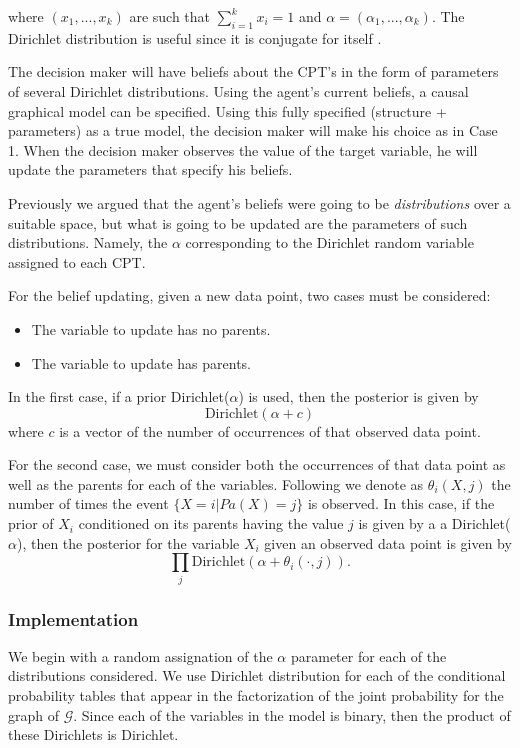 \documentclass[english,letterpaper,12pt,final]{article}
\theoremstyle{definition}
\begin{document}
where $(x_1,...,x_k)$ are such that $\sum_{i=1}^k x_i =1$ and $\alpha=(\alpha_1,...,\alpha_k)$. The Dirichlet distribution is useful since it is conjugate for itself \cite{bernardo2000bayesian}.

The decision maker will have beliefs about the CPT's in the form of parameters of several Dirichlet distributions. Using the agent's current beliefs, a causal graphical model can be specified. Using this fully specified (structure + parameters) as a true model, the decision maker will make his choice as in Case 1. When the decision maker observes the value of the target variable, he will update the parameters that specify his beliefs.

Previously we argued that the agent's beliefs were going to be \textit{distributions} over a suitable space, but what is going to be updated are the parameters of such distributions. Namely, the $\alpha$ corresponding to the Dirichlet random variable assigned to each CPT.

For the belief updating, given a new data point,  two cases must be considered:
\begin{itemize}
\item The variable to update has no parents.
\item The variable to update has parents.
\end{itemize}

In the first case, if a prior Dirichlet($\alpha$) is used, then the posterior is given by
\[ \textrm{Dirichlet}(\alpha + c) \]
where $c$ is a vector of the number of occurrences of that observed data point. 

For the second case, we must consider both the occurrences of that data point as well as the parents for each of the variables. Following \cite{barber2012bayesian} we denote as $\theta_i(X,j)$ the number of times the event $\{X=i | Pa(X)=j\}$ is observed. In this case, if the prior of $X_i$ conditioned on its parents having the value $j$ is given by a a Dirichlet($\alpha$), then the posterior for the variable $X_i$ given an observed data point is given by 
\[ \prod_j \textrm{Dirichlet}(\alpha + \theta_i(\cdot,j)). \]

\subsubsection{Implementation}
We begin with a random assignation of the $\alpha$ parameter for each of the distributions considered. We use Dirichlet distribution for each of the conditional probability tables that appear in the factorization of the joint probability for the graph of $\mathcal{G}$. Since each of the variables in the model is binary, then the product of these Dirichlets is Dirichlet.
\end{document}
